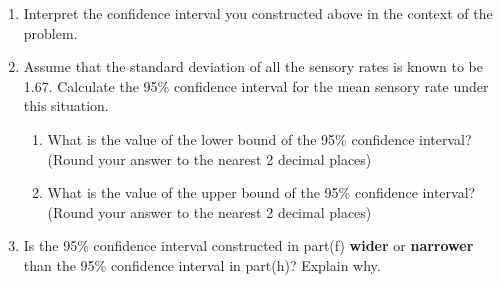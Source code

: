 \begin{enumerate}
\begin{enumerate}
\end{enumerate}
\item  Interpret the confidence interval you constructed above in the context of the problem.\newline
{}
    \newpage   \item Assume that the standard deviation of all the sensory rates is known to be 1.67. %
      Calculate the 95\% confidence interval for the mean sensory rate under this situation. 
      \begin{enumerate}
      \item What is the value of the lower bound of the 95\% confidence interval? (Round your answer to the nearest 2 decimal places)  \\ 
      \item What is the value of the upper bound of the 95\% confidence interval? (Round your answer to the nearest 2 decimal places)  \\ 
      \end{enumerate}
      \item Is the 95\% confidence interval constructed in part(f) \textbf{wider} or \textbf{narrower} than the 95\% confidence interval in part(h)? Explain why.\\ 
  \\



\end{enumerate}

